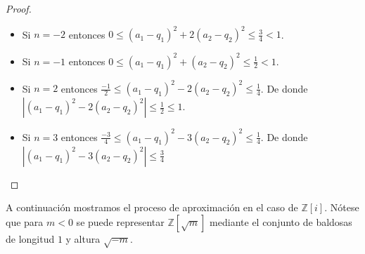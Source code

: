 \begin{proof}
\begin{enumerate}
	\begin{itemize}
		\item Si $n = -2$ entonces $0 \le (a_1-q_1)^2 + 2(a_2-q_2)^2 \le \frac{3}{4} < 1$.
		\item Si $n = -1$ entonces $0 \le (a_1-q_1)^2 + (a_2-q_2)^2 \le \frac{1}{2} < 1$. 
		\item Si $n = 2$ entonces $\frac{-1}{2} \le (a_1-q_1)^2-2(a_2-q_2)^2 \le \frac{1}{4}$. De donde $|(a_1-q_1)^2-2(a_2-q_2)^2 | \le \frac{1}{2} \le 1$. 
		\item Si $n = 3$ entonces $\frac{-3}{4} \le (a_1-q_1)^2 - 3(a_2-q_2)^2 \le \frac{1}{4}$. De donde $|(a_1-q_1)^2 - 3(a_2-q_2)^2| \le \frac{3}{4}$
	\end{itemize}
	\end{enumerate}
\end{proof}

A continuación mostramos el proceso de aproximación en el caso de $\mathbb{Z}[i]$. Nótese que para $m < 0$ se puede representar $\mathbb{Z}[\sqrt{m}]$ mediante el conjunto de baldosas de longitud $1$ y altura $\sqrt{-m}$.

\begin{figure}[H]
	\centering
\end{figure}

